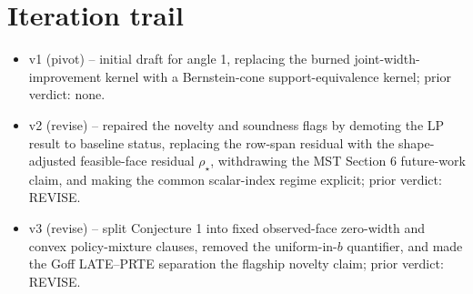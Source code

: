 \documentclass[11pt]{article}
\theoremstyle{definition}
\theoremstyle{plain}
\theoremstyle{remark}
\begin{document}
\section{Iteration trail}
\begin{itemize}[leftmargin=*]
\item v1 (pivot) -- initial draft for angle 1, replacing the burned joint-width-improvement kernel with a Bernstein-cone support-equivalence kernel; prior verdict: none.
\item v2 (revise) -- repaired the novelty and soundness flags by demoting the LP result to baseline status, replacing the row-span residual with the shape-adjusted feasible-face residual \(\rho_\star\), withdrawing the MST Section 6 future-work claim, and making the common scalar-index regime explicit; prior verdict: REVISE.
\item v3 (revise) -- split Conjecture 1 into fixed observed-face zero-width and convex policy-mixture clauses, removed the uniform-in-\(b\) quantifier, and made the Goff LATE--PRTE separation the flagship novelty claim; prior verdict: REVISE.
\end{itemize}
\end{document}
